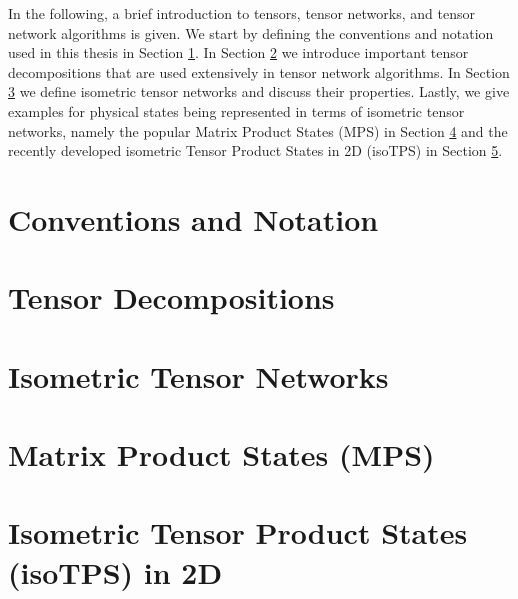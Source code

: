 In the following, a brief introduction to tensors, tensor networks, and tensor network algorithms is given. We start by defining the conventions and notation used in this thesis in Section \ref{sec:tensors_and_tensor_networks_conventions_and_notation}. In Section \ref{sec:tensors_and_tensor_networks_tensor_decompositions} we introduce important tensor decompositions that are used extensively in tensor network algorithms. In Section \ref{sec:tensors_and_tensor_networks_isometric_tensor_networks} we define isometric tensor networks and discuss their properties. Lastly, we give examples for physical states being represented in terms of isometric tensor networks, namely the popular Matrix Product States (MPS) in Section \ref{sec:tensors_and_tensor_networks_matrix_product_states} and the recently developed isometric Tensor Product States in 2D (isoTPS) in Section \ref{sec:tensors_and_tensor_networks_isometric_tensor_product_states_in_2D}.

\section{Conventions and Notation}
\label{sec:tensors_and_tensor_networks_conventions_and_notation}


\newpage
\section{Tensor Decompositions}
\label{sec:tensors_and_tensor_networks_tensor_decompositions}


\section{Isometric Tensor Networks}
\label{sec:tensors_and_tensor_networks_isometric_tensor_networks}


\newpage
\section{Matrix Product States (MPS)}
\label{sec:tensors_and_tensor_networks_matrix_product_states}


\section{Isometric Tensor Product States (isoTPS) in 2D}
\label{sec:tensors_and_tensor_networks_isometric_tensor_product_states_in_2D}
